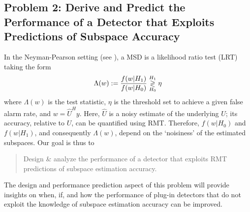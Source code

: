 \subsection{Problem 2: Derive and Predict the Performance of a Detector that Exploits  Predictions of Subspace Accuracy}\label{sec:ps_prob2}
In the  Neyman-Pearson setting (see \cite{van1968detection}), a MSD is a likelihood ratio test (LRT) taking the form
\begin{equation*}
\Lambda(w):=\dfrac{f(w|H_1)}{f(w|H_0)} \overset{H_1}{\underset{H_0}{\gtrless}} \eta
\end{equation*}
where $\Lambda(w)$ is the test statistic, $\eta$ is the threshold set to achieve a given false alarm rate, and $w = \widehat{U}^{H}y$. Here, $\widehat{U}$ is a noisy estimate of the underlying $U$; its accuracy, relative to $U$, can be quantified using RMT. Therefore, $f(w|H_0)$ and $f(w|H_1)$, and consequently $\Lambda(w)$, depend on the `noisiness' of the estimated subspaces.  Our goal is thus to
\begin{quote}
Design \& analyze the performance of  a detector that exploits RMT predictions of subspace estimation accuracy.
\end{quote}
The design and performance prediction aspect of this problem will provide insights on when, if, and how the performance of plug-in detectors that do not exploit the knowledge of subspace estimation accuracy can be improved.


